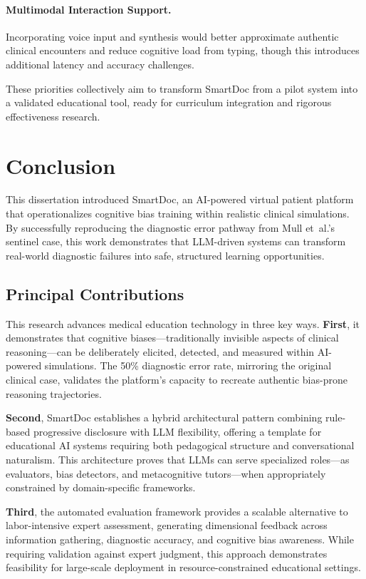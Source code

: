 \paragraph{Multimodal Interaction Support.}
Incorporating voice input and synthesis would better approximate authentic clinical
encounters and reduce cognitive load from typing, though this introduces additional latency
and accuracy challenges.

\noindent
These priorities collectively aim to transform SmartDoc from a pilot system into a validated
educational tool, ready for curriculum integration and rigorous effectiveness research.

\section{Conclusion}

This dissertation introduced SmartDoc, an AI-powered virtual patient platform that operationalizes
cognitive bias training within realistic clinical simulations. By successfully reproducing the
diagnostic error pathway from Mull et~al.'s sentinel case, this work demonstrates that LLM-driven
systems can transform real-world diagnostic failures into safe, structured learning opportunities.

\subsection{Principal Contributions}

This research advances medical education technology in three key ways. \textbf{First}, it
demonstrates that cognitive biases—traditionally invisible aspects of clinical reasoning—can be
deliberately elicited, detected, and measured within AI-powered simulations. The 50\% diagnostic
error rate, mirroring the original clinical case, validates the platform's capacity to recreate
authentic bias-prone reasoning trajectories.

\textbf{Second}, SmartDoc establishes a hybrid architectural pattern combining rule-based
progressive disclosure with LLM flexibility, offering a template for educational AI systems requiring
both pedagogical structure and conversational naturalism. This architecture proves that LLMs can
serve specialized roles—as evaluators, bias detectors, and metacognitive tutors—when appropriately
constrained by domain-specific frameworks.

\textbf{Third}, the automated evaluation framework provides a scalable alternative to
labor-intensive expert assessment, generating dimensional feedback across information gathering,
diagnostic accuracy, and cognitive bias awareness. While requiring validation against expert
judgment, this approach demonstrates feasibility for large-scale deployment in resource-constrained
educational settings.

